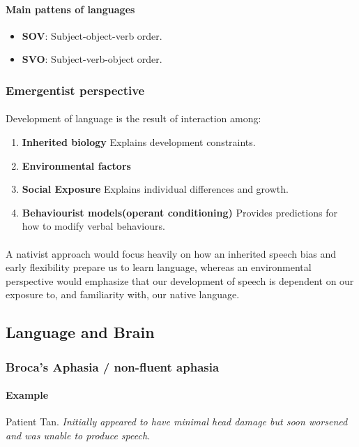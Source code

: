 \documentclass{article}
\begin{document}
	\paragraph{Main pattens of languages}
	\begin{itemize}
		\item \textbf{SOV}: Subject-object-verb order.
		\item \textbf{SVO}: Subject-verb-object order.
	\end{itemize}

	\subsubsection{Emergentist perspective}
	\paragraph{} Development of language is the result of interaction among:
	\begin{enumerate}
		\item \textbf{Inherited biology} Explains development constraints.
		\item \textbf{Environmental factors}
		\item \textbf{Social Exposure} Explains individual differences and growth.
		\item \textbf{Behaviourist models(operant conditioning)} Provides predictions for how to modify verbal behaviours. 
	\end{enumerate}
	\paragraph{} A nativist approach would focus heavily on how an inherited speech bias and early flexibility prepare us to learn language, whereas an environmental perspective would emphasize that our development of speech is dependent on our exposure to, and familiarity with, our native language.
	\subsection{Language and Brain}
	\subsubsection{Broca's Aphasia / non-fluent aphasia}
	\paragraph{Example} Patient Tan. \emph{Initially appeared to have minimal head damage but soon worsened and was unable to produce speech.}
\end{document}
